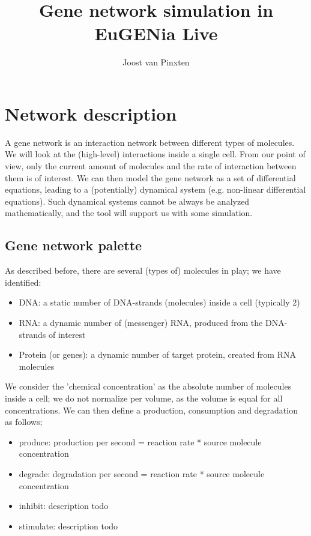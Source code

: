 \documentclass[]{article}
\title{Gene network simulation in EuGENia Live}
\author{Joost van Pinxten}
\begin{document}
\maketitle

\section{Network description}
A gene network is an interaction network between different types of molecules. We will look at the (high-level) interactions inside a single cell. From our point of view, only the current amount of molecules and the rate of interaction between them is of interest. We can then model the gene network as a set of differential equations, leading to a (potentially) dynamical system (e.g. non-linear differential equations). Such dynamical systems cannot be always be analyzed mathematically, and the tool will support us with some simulation.

\subsection{Gene network palette}

As described before, there are several (types of) molecules in play; we have identified:

\begin{itemize}
	\item DNA: a static number of DNA-strands (molecules) inside a cell (typically 2)
	\item RNA: a dynamic number of (messenger) RNA, produced from the DNA-strands of interest
	\item Protein (or genes): a dynamic number of target protein, created from RNA molecules
\end{itemize}

We consider the 'chemical concentration' as the absolute number of molecules inside a cell; we do not normalize per volume, as the volume is equal for all concentrations. We can then define a production, consumption and degradation as follows;

\begin{itemize}
	\item produce: production per second = reaction rate * source molecule concentration
	\item degrade: degradation per second = reaction rate * source molecule concentration
	\item inhibit: description todo
	\item stimulate: description todo
\end{itemize}
\end{document}
